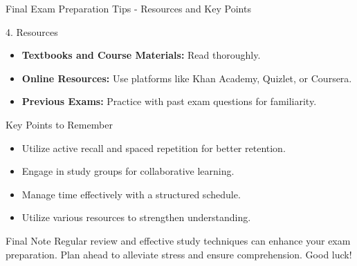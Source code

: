 \documentclass[aspectratio=169]{beamer}
\begin{document}
\begin{frame}[fragile]{Final Exam Preparation Tips - Resources and Key Points}
    \begin{block}{4. Resources}
        \begin{itemize}
            \item \textbf{Textbooks and Course Materials:} Read thoroughly.
            \item \textbf{Online Resources:} Use platforms like Khan Academy, Quizlet, or Coursera.
            \item \textbf{Previous Exams:} Practice with past exam questions for familiarity.
        \end{itemize}
    \end{block}

    \begin{block}{Key Points to Remember}
        \begin{itemize}
            \item Utilize active recall and spaced repetition for better retention.
            \item Engage in study groups for collaborative learning.
            \item Manage time effectively with a structured schedule.
            \item Utilize various resources to strengthen understanding.
        \end{itemize}
    \end{block}

    \begin{block}{Final Note}
        Regular review and effective study techniques can enhance your exam preparation. Plan ahead to alleviate stress and ensure comprehension. Good luck!
    \end{block}
\end{frame}
\end{document}
